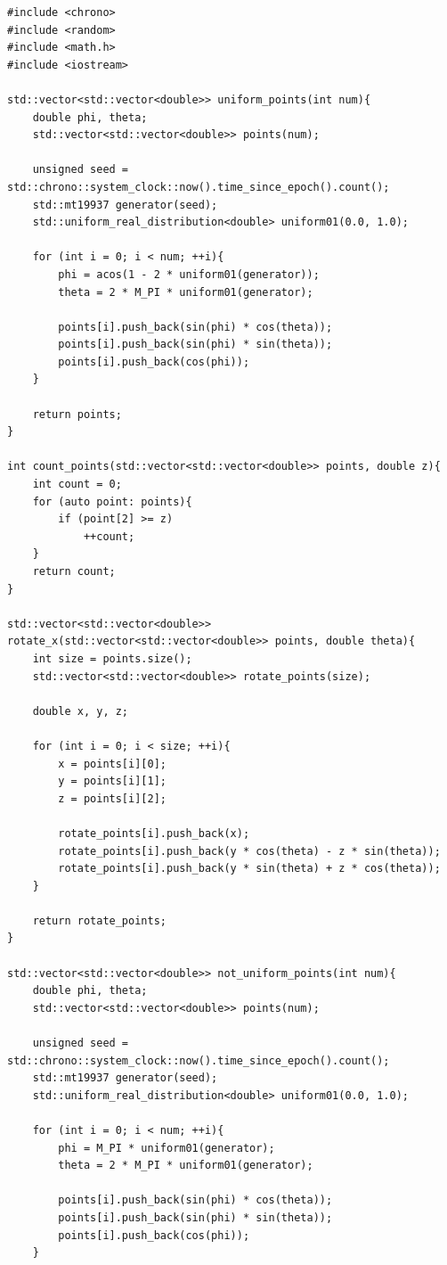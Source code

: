 \documentclass{article}
\begin{document}
\begin{lstlisting}
#include <chrono>
#include <random>
#include <math.h>
#include <iostream>

std::vector<std::vector<double>> uniform_points(int num){
    double phi, theta;
    std::vector<std::vector<double>> points(num);

    unsigned seed = std::chrono::system_clock::now().time_since_epoch().count();
    std::mt19937 generator(seed);
    std::uniform_real_distribution<double> uniform01(0.0, 1.0);

    for (int i = 0; i < num; ++i){
        phi = acos(1 - 2 * uniform01(generator));
        theta = 2 * M_PI * uniform01(generator);

        points[i].push_back(sin(phi) * cos(theta));
        points[i].push_back(sin(phi) * sin(theta));
        points[i].push_back(cos(phi));
    }

    return points;
}

int count_points(std::vector<std::vector<double>> points, double z){
    int count = 0;
    for (auto point: points){
        if (point[2] >= z)
            ++count;
    }
    return count;
}

std::vector<std::vector<double>> rotate_x(std::vector<std::vector<double>> points, double theta){
    int size = points.size();
    std::vector<std::vector<double>> rotate_points(size);

    double x, y, z;

    for (int i = 0; i < size; ++i){
        x = points[i][0];
        y = points[i][1];
        z = points[i][2];

        rotate_points[i].push_back(x);
        rotate_points[i].push_back(y * cos(theta) - z * sin(theta));
        rotate_points[i].push_back(y * sin(theta) + z * cos(theta));
    }

    return rotate_points;
}

std::vector<std::vector<double>> not_uniform_points(int num){
    double phi, theta;
    std::vector<std::vector<double>> points(num);

    unsigned seed = std::chrono::system_clock::now().time_since_epoch().count();
    std::mt19937 generator(seed);
    std::uniform_real_distribution<double> uniform01(0.0, 1.0);

    for (int i = 0; i < num; ++i){
        phi = M_PI * uniform01(generator);
        theta = 2 * M_PI * uniform01(generator);

        points[i].push_back(sin(phi) * cos(theta));
        points[i].push_back(sin(phi) * sin(theta));
        points[i].push_back(cos(phi));
    }


\end{lstlisting}
\end{document}
